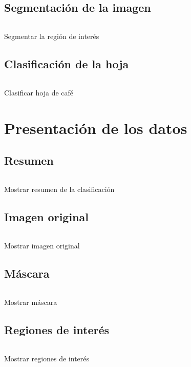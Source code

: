 \subsection{Segmentación de la imagen}
\begin{listing}[!ht]
\inputminted{python}{code_listings/segmentation.py}
\caption{Segmentar la región de interés}
\label{code:segmentation}
\end{listing}

\subsection{Clasificación de la hoja}
\begin{listing}[!ht]
\inputminted{python}{code_listings/categorize.py}
\caption{Clasificar hoja de café}
\label{code:categorize}
\end{listing}

\section{Presentación de los datos}

\subsection{Resumen}
\begin{listing}[!ht]
\inputminted{python}{code_listings/show_summary.py}
\caption{Mostrar resumen de la clasificación}
\label{code:show_summary}
\end{listing}

\subsection{Imagen original}
\begin{listing}[!ht]
\inputminted{python}{code_listings/show_original_image.py}
\caption{Mostrar imagen original}
\label{code:show_original_image}
\end{listing}

\subsection{Máscara}
\begin{listing}[!ht]
\inputminted{python}{code_listings/show_mask.py}
\caption{Mostrar máscara}
\label{code:show_mask}
\end{listing}

\subsection{Regiones de interés}
\begin{listing}[!ht]
\inputminted{python}{code_listings/show_roi.py}
\caption{Mostrar regiones de interés}
\label{code:show_roi}
\end{listing}

